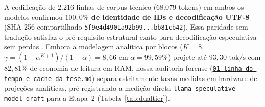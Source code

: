 \documentclass[10pt,a4paper]{article}
\begin{document}
A codifica\c{c}\~ao de $2.216$ linhas de corpus t\'ecnico ($68.079$ tokens) em ambos os modelos confirmou \textbf{$100,0\%$ de identidade de IDs e decodifica\c{c}\~ao UTF-8} (SHA-256 compartilhado \texttt{5f9e4d4901a92b99...bb81cb42}). Essa paridade sem tradu\c{c}\~ao satisfaz o pr\'e-requisito estrutural exato para decodifica\c{c}\~ao especulativa sem perdas \cite{leviathan2023speculative}. Embora a modelagem anal\'itica por blocos ($K=8$, $\gamma = (1-\alpha^{K+1})/(1-\alpha) = 8,66$ em $\alpha=99,59\%$) projete at\'e $93,30\text{ tok/s}$ com $82,81\%$ de economia de leitura em RAM, nossa auditoria forense (\href{https://drive.google.com/file/d/16-3o4ykaOOKaW-S2VTHzpE7Uhj1BA0tl/view?usp=drivesdk}{\texttt{01-linha-do-\allowbreak{}tempo-e-cache-\allowbreak{}da-tese.md}}) separa estritamente taxas medidas em hardware de proje\c{c}\~oes anal\'iticas, pr\'e-registrando a medi\c{c}\~ao direta \texttt{llama-speculative -{}-model-draft} para a Etapa~2 (Tabela~\ref{tab:dualtier}).
\end{document}
